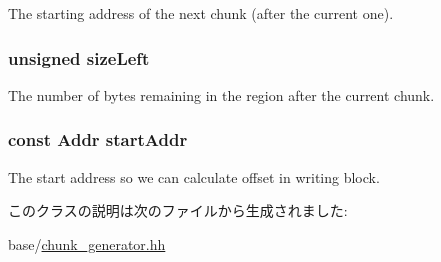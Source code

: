 \label{classChunkGenerator_a76968ef2ad8d208fe33cfb493986e85a}
The starting address of the next chunk (after the current one). \hypertarget{classChunkGenerator_ae4c879109cc558f8eb48b4f92662d550}{
\subsubsection[{sizeLeft}]{\setlength{\rightskip}{0pt plus 5cm}unsigned {\bf sizeLeft}}}
\label{classChunkGenerator_ae4c879109cc558f8eb48b4f92662d550}
The number of bytes remaining in the region after the current chunk. \hypertarget{classChunkGenerator_a6aeb968ddd05c079215ef147ed22708a}{
\subsubsection[{startAddr}]{\setlength{\rightskip}{0pt plus 5cm}const {\bf Addr} {\bf startAddr}}}
\label{classChunkGenerator_a6aeb968ddd05c079215ef147ed22708a}
The start address so we can calculate offset in writing block. 

このクラスの説明は次のファイルから生成されました:\begin{DoxyCompactItemize}
\item 
base/\hyperlink{chunk__generator_8hh}{chunk\_\-generator.hh}\end{DoxyCompactItemize}
